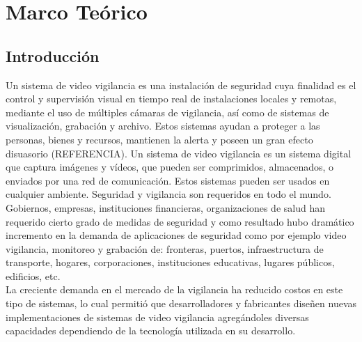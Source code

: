 \chapter{Marco Teórico}

\section{Introducción}
Un sistema de video vigilancia es una instalación de seguridad cuya finalidad es el control y supervisión visual en tiempo real de instalaciones locales y remotas, mediante el uso de múltiples cámaras de vigilancia, así como de sistemas de visualización, grabación y archivo. Estos sistemas ayudan a proteger a las personas, bienes y recursos, mantienen la alerta y poseen un gran efecto disuasorio (REFERENCIA). Un sistema de video vigilancia es un sistema digital que captura imágenes y vídeos, que pueden ser comprimidos, almacenados, o enviados por una red de comunicación. Estos sistemas pueden ser usados en cualquier ambiente. Seguridad y vigilancia son requeridos en todo el mundo. Gobiernos, empresas, instituciones financieras, organizaciones de salud han requerido cierto grado de medidas de seguridad y como resultado hubo dramático incremento en la demanda de aplicaciones de seguridad como por ejemplo video vigilancia, monitoreo y grabación de: fronteras, puertos, infraestructura de transporte, hogares, corporaciones, instituciones educativas, lugares públicos, edificios, etc.\\

La creciente demanda en el mercado de la vigilancia ha reducido costos en este tipo de sistemas, lo cual permitió que desarrolladores y fabricantes diseñen nuevas implementaciones de sistemas de video vigilancia agregándoles diversas capacidades dependiendo de la tecnología utilizada en su desarrollo.\\

